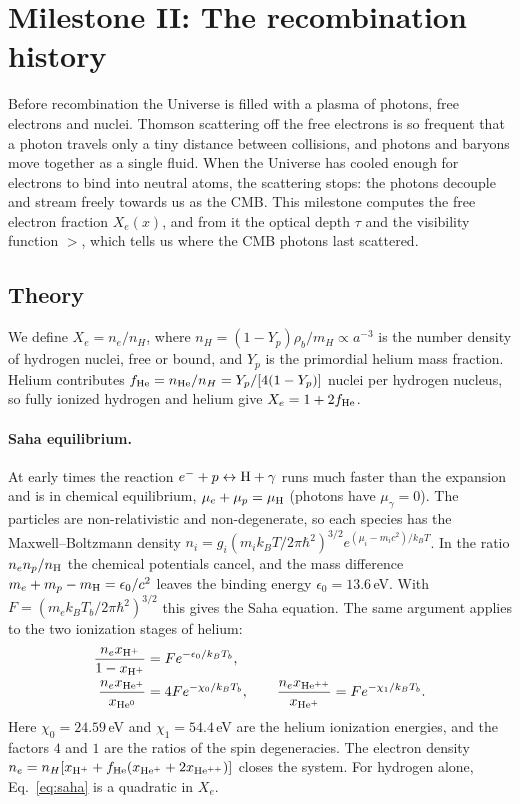 \section{Milestone II: The recombination history}\label{sec:m2}

Before recombination the Universe is filled with a plasma of photons, free electrons and nuclei. Thomson scattering off
the free electrons is so frequent that a photon travels only a tiny distance between collisions, and photons and
baryons move together as a single fluid. When the Universe has cooled enough for electrons to bind into neutral atoms,
the scattering stops: the photons decouple and stream freely towards us as the CMB. This milestone computes the free
electron fraction $X_e(x)$, and from it the optical depth $\tau$ and the visibility function $\gt$, which tells us
where the CMB photons last scattered.

\subsection{Theory}

We define $X_e=n_e/n_H$, where $n_H=(1-Y_p)\rho_b/m_H\propto a^{-3}$ is the number density of hydrogen nuclei, free or
bound, and $Y_p$ is the primordial helium mass fraction. Helium contributes $f_{\rm He}=n_{\rm He}/n_H=Y_p/[4(1-Y_p)]$
nuclei per hydrogen nucleus, so fully ionized hydrogen and helium give $X_e=1+2f_{\rm He}$.

\paragraph*{Saha equilibrium.} At early times the reaction $e^-+p\leftrightarrow{\rm H}+\gamma$ runs much faster than
the expansion and is in chemical equilibrium, $\mu_e+\mu_p=\mu_{\rm H}$ (photons have $\mu_\gamma=0$). The particles are
non-relativistic and non-degenerate, so each species has the Maxwell--Boltzmann density
$n_i=g_i(m_ik_BT/2\pi\hbar^2)^{3/2}e^{(\mu_i-m_ic^2)/k_BT}$. In the ratio $n_en_p/n_{\rm H}$ the chemical potentials
cancel, and the mass difference $m_e+m_p-m_{\rm H}=\epsilon_0/c^2$ leaves the binding energy $\epsilon_0=13.6$\,eV. With
$F=(m_ek_BT_b/2\pi\hbar^2)^{3/2}$ this gives the Saha equation. The same argument applies to the two ionization stages of
helium:
\begin{align}
\frac{n_e x_{\rm H^+}}{1-x_{\rm H^+}} &= F e^{-\epsilon_0/k_BT_b}, \label{eq:saha}\\
\frac{n_e x_{\rm He^+}}{x_{\rm He^0}} &= 4F e^{-\chi_0/k_BT_b},\qquad
\frac{n_e x_{\rm He^{++}}}{x_{\rm He^+}} = F e^{-\chi_1/k_BT_b}.\nonumber
\end{align}
Here $\chi_0=24.59$\,eV and $\chi_1=54.4$\,eV are the helium ionization energies, and the factors $4$ and $1$ are the
ratios of the spin degeneracies. The electron density
$n_e=n_H[x_{\rm H^+}+f_{\rm He}(x_{\rm He^+}+2x_{\rm He^{++}})]$ closes the system. For hydrogen alone,
Eq.~\eqref{eq:saha} is a quadratic in $X_e$.

